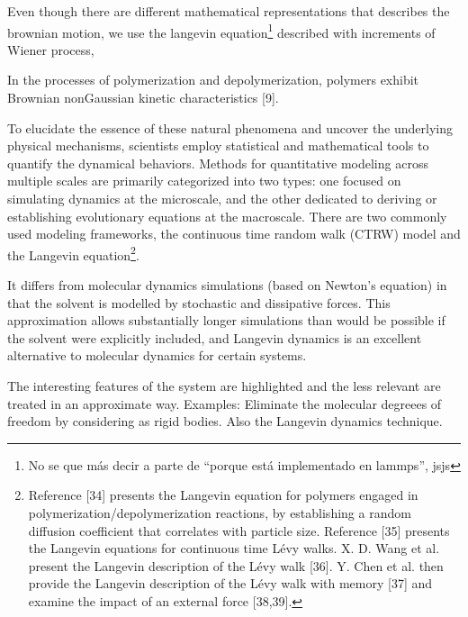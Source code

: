 \documentclass[../../main-notes.tex]{subfiles}
\begin{document}
{Even though there are different mathematical representations that describes the brownian motion, we use the langevin equation\footnote{No se que más decir a parte de ``porque está implementado en lammps'', jsjs} described with increments of Wiener process,


In the processes of polymerization and depolymerization, polymers exhibit Brownian nonGaussian kinetic characteristics [9]\citep{wangMultiscaleModelingSimulation2025}.


To elucidate the essence of these natural phenomena and uncover the underlying physical mechanisms, scientists employ statistical and mathematical tools to quantify the dynamical behaviors.
Methods for quantitative modeling across multiple scales are primarily categorized into two types: one focused on simulating dynamics at the microscale, and the other dedicated to deriving or establishing evolutionary equations at the macroscale.
There are two commonly used modeling frameworks, the continuous time random walk (CTRW) model and the Langevin equation\footnote{Reference [34] presents the Langevin equation for polymers engaged in polymerization/depolymerization reactions, by establishing a random diffusion coefficient that correlates with particle size. Reference [35] presents the Langevin equations for continuous time Lévy walks. X. D. Wang et al. present the Langevin description of the Lévy walk [36]. Y. Chen et al. then provide the Langevin description of the Lévy walk with memory [37] and examine the impact of an external force [38,39]\citep{wangMultiscaleModelingSimulation2025}.

}\citep{wangMultiscaleModelingSimulation2025}.

It differs from molecular dynamics simulations (based on Newton's equation) in that the solvent is modelled by stochastic and dissipative forces. 
This approximation allows substantially longer simulations than would be possible if the solvent were explicitly included, and Langevin dynamics is an excellent alternative to molecular dynamics for certain systems\citep{pastorTechniquesApplicationsLangevin1994}.



The interesting features of the system are highlighted and the less relevant are treated in an approximate way.
Examples: Eliminate the molecular degreees of freedom by considering as rigid bodies.
Also the Langevin dynamics technique.

}
\end{document}
